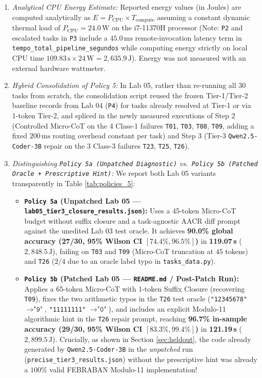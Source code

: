 \documentclass[10pt,a4paper]{article}
\begin{document}
\begin{enumerate}
    \item \emph{Analytical CPU Energy Estimate:} Reported energy values (in Joules) are computed analytically as $E = P_{\text{CPU}} \times T_{\text{compute}}$ assuming a constant dynamic thermal load of $P_{\text{CPU}} = 24.0\,\text{W}$ on the i7-11370H processor (Note: \texttt{P2} and escalated tasks in \texttt{P3} include a $45.0\,\text{ms}$ remote-invocation latency term in \texttt{tempo\_total\_pipeline\_segundos} while computing energy strictly on local CPU time $109.83\,\text{s} \times 24\,\text{W} = 2,635.9\,\text{J}$). Energy was not measured with an external hardware wattmeter.
    \item \emph{Hybrid Consolidation of Policy 5:} In Lab 05, rather than re-running all 30 tasks from scratch, the consolidation script reused the frozen Tier-1/Tier-2 baseline records from Lab 04 (\texttt{P4}) for tasks already resolved at Tier-1 or via 1-token Tier-2, and spliced in the newly measured executions of Step 2 (Controlled Micro-CoT on the 4 Class-1 failures \texttt{T01}, \texttt{T03}, \texttt{T08}, \texttt{T09}, adding a fixed $200\,\text{ms}$ routing overhead constant per task) and Step 3 (Tier-3 \texttt{Qwen2.5-Coder-3B} repair on the 3 Class-3 failures \texttt{T23}, \texttt{T25}, \texttt{T26}).
    \item \emph{Distinguishing \texttt{Policy 5a (Unpatched Diagnostic)} vs.\ \texttt{Policy 5b (Patched Oracle + Prescriptive Hint)}:} We report both Lab 05 variants transparently in Table \ref{tab:policies_5}:
    \begin{itemize}
        \item \textbf{\texttt{Policy 5a} (Unpatched Lab 05 — \texttt{lab05\_tier3\_closure\_results.json}):} Uses a 45-token Micro-CoT budget without suffix closure and a task-agnostic AACR diff prompt against the unedited Lab 03 test oracle. It achieves \textbf{90.0\% global accuracy (27/30, 95\% Wilson CI $[74.4\%, 96.5\%]$)} in \textbf{119.07\,s} ($2,848.5\,\text{J}$), failing on \texttt{T03} and \texttt{T09} (Micro-CoT truncation at $45$ tokens) and \texttt{T26} ($2/4$ due to an oracle label typo in \texttt{tasks\_data.py}).
        \item \textbf{\texttt{Policy 5b} (Patched Lab 05 — \texttt{README.md} / Post-Patch Run):} Applies a 65-token Micro-CoT with 1-token Suffix Closure (recovering \texttt{T09}), fixes the two arithmetic typos in the \texttt{T26} test oracle (\texttt{"12345678"} $\to \texttt{"9"}$, \texttt{"11111111"} $\to \texttt{"0"}$), and includes an explicit Modulo-11 algorithmic hint in the \texttt{T26} repair prompt, reaching \textbf{96.7\% in-sample accuracy (29/30, 95\% Wilson CI $[83.3\%, 99.4\%]$)} in \textbf{121.19\,s} ($2,899.5\,\text{J}$). Crucially, as shown in Section \ref{sec:heldout}, the code already generated by \texttt{Qwen2.5-Coder-3B} in the \emph{unpatched} run (\texttt{precise\_tier3\_results.json}) without the prescriptive hint was already a $100\%$ valid FEBRABAN Modulo-11 implementation!
    \end{itemize}
\end{enumerate}
\end{document}
